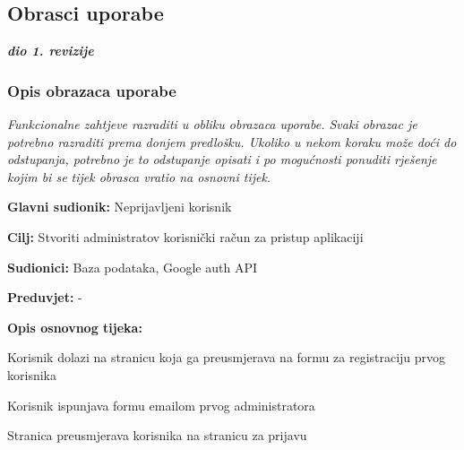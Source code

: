 			\eject 
			


			\subsection{Obrasci uporabe}
				
				\textbf{\textit{dio 1. revizije}}
				
				\subsubsection{Opis obrazaca uporabe}
					\textit{Funkcionalne zahtjeve razraditi u obliku obrazaca uporabe. Svaki obrazac je potrebno razraditi prema donjem predlošku. Ukoliko u nekom koraku može doći do odstupanja, potrebno je to odstupanje opisati i po mogućnosti ponuditi rješenje kojim bi se tijek obrasca vratio na osnovni tijek.}

					\noindent {}
					\begin{packed_item}

						\item \textbf{Glavni sudionik:} Neprijavljeni korisnik
						\item \textbf{Cilj:} Stvoriti administratov korisnički račun za pristup aplikaciji
						\item \textbf{Sudionici:} Baza podataka, Google auth API
						\item \textbf{Preduvjet:} - 
						\item \textbf{Opis osnovnog tijeka:}

						\item[] \begin{packed_enum}

							\item Korisnik dolazi na stranicu koja ga preusmjerava na formu za registraciju prvog korisnika
							\item Korisnik ispunjava formu emailom prvog administratora
							\item Stranica preusmjerava korisnika na stranicu za prijavu
						\end{packed_enum}
					\end{packed_item}

